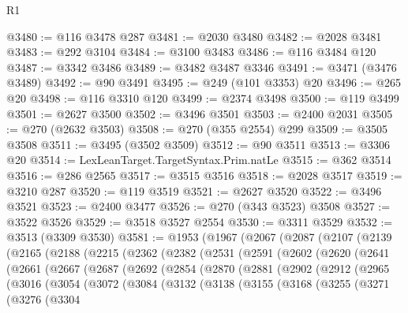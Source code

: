 \begin{lexlean}{R1}
\begin{coremodule}
@3480 := @116 @3478 @287
@3481 := @2030 @3480
@3482 := @2028 @3481
@3483 := @292 @3104
@3484 := @3100 @3483
@3486 := @116 @3484 @120
@3487 := @3342 @3486
@3489 := @3482 @3487 @3346
@3491 := @3471 (@3476 @3489)
@3492 := @90 @3491
@3495 := @249 (@101 @3353) @20
@3496 := @265 @20
@3498 := @116 @3310 @120
@3499 := @2374 @3498
@3500 := @119 @3499
@3501 := @2627 @3500
@3502 := @3496 @3501
@3503 := @2400 @2031
@3505 := @270 (@2632 @3503)
@3508 := @270 (@355 @2554) @299
@3509 := @3505 @3508
@3511 := @3495 (@3502 @3509)
@3512 := @90 @3511
@3513 := @3306 @20
@3514 := LexLeanTarget.TargetSyntax.Prim.natLe
@3515 := @362 @3514
@3516 := @286 @2565
@3517 := @3515 @3516
@3518 := @2028 @3517
@3519 := @3210 @287
@3520 := @119 @3519
@3521 := @2627 @3520
@3522 := @3496 @3521
@3523 := @2400 @3477
@3526 := @270 (@343 @3523) @3508
@3527 := @3522 @3526
@3529 := @3518 @3527 @2554
@3530 := @3311 @3529
@3532 := @3513 (@3309 @3530)
@3581 := @1953
    (@1967
      (@2067
        (@2087
          (@2107
            (@2139
              (@2165
                (@2188
                  (@2215
                    (@2362
                      (@2382
                        (@2531
                          (@2591
                            (@2602
                              (@2620
                                (@2641
                                  (@2661
                                    (@2667
                                      (@2687
                                        (@2692
                                          (@2854
                                            (@2870
                                              (@2881
                                                (@2902
                                                  (@2912
                                                    (@2965
                                                      (@3016
                                                        (@3054
                                                          (@3072
                                                            (@3084
                                                              (@3132
                                                                (@3138
                                                                  (@3155
                                                                    (@3168
                                                                      (@3255
                                                                        (@3271
                                                                          (@3276
                                                                            (@3304

\end{coremodule}
\end{lexlean}
